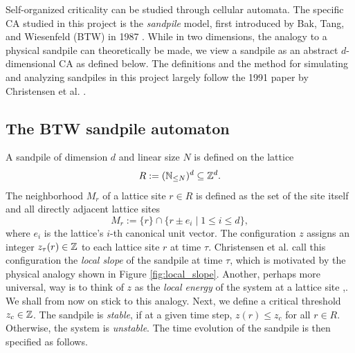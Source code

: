 Self-organized criticality can be studied through cellular automata. The specific CA studied in this project is the \emph{sandpile} model, first introduced by Bak, Tang, and Wiesenfeld (BTW) in 1987 \cite{bak1987self}. While in two dimensions, the analogy to a physical sandpile can theoretically be made, we view a sandpile as an abstract $d$-dimensional CA as defined below. The definitions and the method for simulating and analyzing sandpiles in this project largely follow the 1991 paper by Christensen et al. \cite{christensen1991dynamical}.

\subsection{The BTW sandpile automaton}


A sandpile of dimension $d$ and linear size $N$ is defined on the lattice
\begin{equation}
    R := (\mathbb{N}_{\leq N})^d \subseteq \mathbb{Z}^d.
\end{equation}
The neighborhood $M_r$ of a lattice site $r\in R$ is defined as the set of the site itself and all directly adjacent lattice sites
\begin{equation}
    M_r := \{r\} \cap \{r \pm e_i \mid 1\leq i\leq d\},
\end{equation}
where $e_i$ is the lattice's $i$-th canonical unit vector. The configuration $z$ assigns an integer $z_\tau(r)\in\mathbb{Z}$ to each lattice site $r$ at time $\tau$. Christensen et al. \cite{christensen1991dynamical} call this configuration the \emph{local slope} of the sandpile at time $\tau$, which is motivated by the physical analogy shown in Figure \ref{fig:local_slope}. Another, perhaps more universal, way is to think of $z$ as the \emph{local energy} of the system at a lattice site \cite{barrat1999fluctuations},\cite{markovic2014power}. We shall from now on stick to this analogy. Next, we define a critical threshold $z_c\in\mathbb{Z}$. The sandpile is \emph{stable}, if at a given time step, $z(r) \leq z_c$ for all $r\in R$. Otherwise, the system is \emph{unstable}. The time evolution of the sandpile is then specified as follows.


